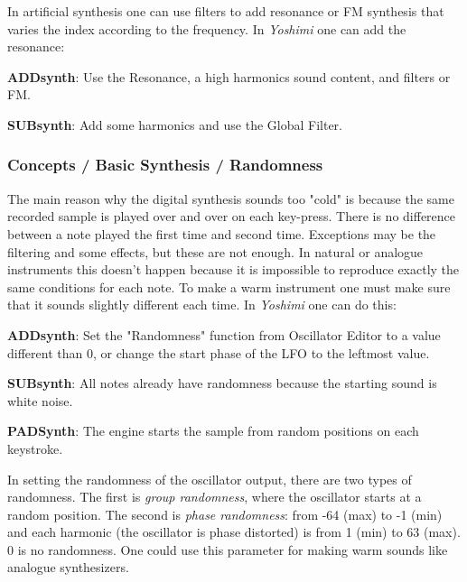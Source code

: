    In artificial synthesis one can use filters to add resonance or FM
   synthesis that varies the index according to the frequency.  In
   \textsl{Yoshimi} one can add the resonance:

   \begin{enumber}
      \item \textbf{ADDsynth}:
      Use the Resonance, a high harmonics sound content, and filters or FM.
      \item \textbf{SUBsynth}:
      Add some harmonics and use the Global Filter.
   \end{enumber}

\subsubsection{Concepts / Basic Synthesis / Randomness}
\label{subsubsec:concepts_basics_randomness}

   The main reason why the digital synthesis sounds too "cold" is because the
   same recorded sample is played over and over on each key-press.  There is
   no difference between a note played the first time and second time.
   Exceptions may be the filtering and some effects, but these are not
   enough. In natural or analogue instruments this doesn't happen because
   it is impossible to reproduce exactly the same conditions for each
   note. To make a warm instrument one must make sure that it sounds
   slightly different each time. In \textsl{Yoshimi}
   one can do this:

   \begin{enumber}
      \item \textbf{ADDsynth}:
      Set the "Randomness" function from Oscillator Editor
      to a value different than 0, or change the start phase of the LFO to
      the leftmost value.
      \item \textbf{SUBsynth}:
      All notes already have randomness because the
      starting sound is white noise.
      \item \textbf{PADSynth}:
      The engine starts the sample from random positions
      on each keystroke.
   \end{enumber}

   In setting the randomness of the oscillator output, there are two types of
   randomness. The first is \textsl{group randomness}, where the oscillator
   starts at a random position. The second is \textsl{phase randomness}:
   from -64 (max) to -1 (min) and each harmonic (the oscillator is phase
   distorted) is from 1 (min) to 63 (max). 0 is no randomness. One
   could use this parameter for making warm sounds like analogue
   synthesizers.

